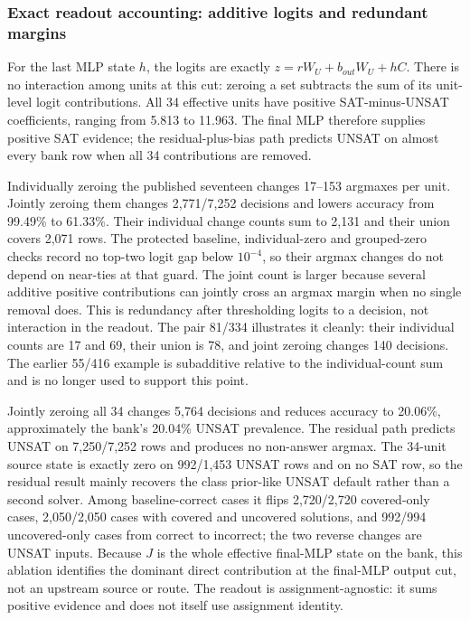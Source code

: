 \documentclass[
  british,
  11pt,
  a4paper,
]{article}
\begin{document}
\subsubsection{Exact readout accounting: additive logits and redundant
margins}\label{exact-readout-accounting-additive-logits-and-redundant-margins}

For the last MLP state \(h\), the logits are exactly
\(z=rW_U+b_{out}W_U+hC\). There is no interaction among units at this
cut: zeroing a set subtracts the sum of its unit-level logit
contributions. All 34 effective units have positive SAT-minus-UNSAT
coefficients, ranging from 5.813 to 11.963. The final MLP therefore
supplies positive SAT evidence; the residual-plus-bias path predicts
UNSAT on almost every bank row when all 34 contributions are removed.

Individually zeroing the published seventeen changes 17--153 argmaxes
per unit. Jointly zeroing them changes 2,771/7,252 decisions and lowers
accuracy from 99.49\% to 61.33\%. Their individual change counts sum to
2,131 and their union covers 2,071 rows. The protected baseline,
individual-zero and grouped-zero checks record no top-two logit gap
below \(10^{-4}\), so their argmax changes do not depend on near-ties at
that guard. The joint count is larger because several additive positive
contributions can jointly cross an argmax margin when no single removal
does. This is redundancy after thresholding logits to a decision, not
interaction in the readout. The pair 81/334 illustrates it cleanly:
their individual counts are 17 and 69, their union is 78, and joint
zeroing changes 140 decisions. The earlier 55/416 example is subadditive
relative to the individual-count sum and is no longer used to support
this point.

Jointly zeroing all 34 changes 5,764 decisions and reduces accuracy to
20.06\%, approximately the bank's 20.04\% UNSAT prevalence. The residual
path predicts UNSAT on 7,250/7,252 rows and produces no non-answer
argmax. The 34-unit source state is exactly zero on 992/1,453 UNSAT rows
and on no SAT row, so the residual result mainly recovers the class
prior-like UNSAT default rather than a second solver. Among
baseline-correct cases it flips 2,720/2,720 covered-only cases,
2,050/2,050 cases with covered and uncovered solutions, and 992/994
uncovered-only cases from correct to incorrect; the two reverse changes
are UNSAT inputs. Because \(J\) is the whole effective final-MLP state
on the bank, this ablation identifies the dominant direct contribution
at the final-MLP output cut, not an upstream source or route. The
readout is assignment-agnostic: it sums positive evidence and does not
itself use assignment identity.
\end{document}
